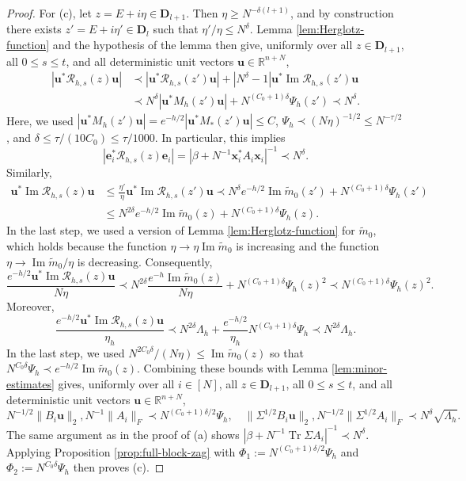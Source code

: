 \documentclass[11pt,reqno]{amsart}
\def\R{\mathbb{R}}
\def\e{\mathbf{e}}
\def\u{\mathbf{u}}
\def\x{\mathbf{x}}
\def\cR{\mathcal{R}}
\def\bD{\mathbf{D}}
\def\Im{\operatorname{Im}}
\def\Tr{\operatorname{Tr}}
\theoremstyle{definition}
\numberwithin{equation}{section}
\numberwithin{figure}{section}
\begin{document}
\begin{proof}
For (c), let $z=E+i\eta\in\bD_{l+1}$. Then $\eta\geq N^{-\delta(l+1)}$, and by construction there exists $z'=E+i\eta'\in\bD_l$ such that $\eta'/\eta\leq N^\delta$. Lemma \ref{lem:Herglotz-function} and the hypothesis of the lemma then give, uniformly over all $z\in\bD_{l+1}$, all $0\le s\leq t$, and all deterministic unit vectors $\u\in\R^{n+N}$,
\begin{align*}
    |\u^*\cR_{h,s}(z)\u|&\prec|\u^*\cR_{h,s}(z')\u|+|N^\delta-1|\u^*\Im\cR_{h,s}(z')\u\\
    &\prec N^\delta|\u^*M_h(z')\u|+N^{(C_0+1)\delta}\Psi_h(z')\prec N^\delta.
\end{align*}
Here, we used $|\u^*M_h(z')\u|=e^{-h/2}|\u^*M_*(z')\u|\leq C$, $\Psi_h\prec (N\eta)^{-1/2}\leq N^{-\tau/2}$, and $\delta\leq \tau/(10C_0)\leq\tau/1000$. In particular, this implies
\[ 
    |\e_i^*\cR_{h,s}(z)\e_i|=|\beta+N^{-1}\x_i^*A_i\x_i|^{-1}\prec N^\delta .
\]
Similarly,
\begin{align*}
    \u^*\Im\cR_{h,s}(z)\u&\leq \frac{\eta'}{\eta}\u^*\Im\cR_{h,s}(z')\u\prec N^\delta e^{-h/2}\Im\widetilde m_0(z')+N^{(C_0+1)\delta}\Psi_h(z')\\
    &\le N^{2\delta}e^{-h/2}\Im\widetilde m_0(z)+N^{(C_0+1)\delta}\Psi_h(z) . 
\end{align*}
In the last step, we used a version of Lemma \ref{lem:Herglotz-function} for $\widetilde m_0$, which holds because the function $\eta\rightarrow \eta\Im\widetilde m_0$ is increasing and the function $\eta\rightarrow\Im\widetilde m_0/\eta$ is decreasing. Consequently,
\[
    \frac{e^{-h/2}\u^*\Im\cR_{h,s}(z)\u}{N\eta}\prec N^{2\delta}\frac{e^{-h}\Im\widetilde m_0(z)}{N\eta}+N^{(C_0+1)\delta}\Psi_h(z)^2\prec N^{(C_0+1)\delta}\Psi_h(z)^2 .
\]
Moreover,
\[
    \frac{e^{-h/2}\u^*\Im\cR_{h,s}(z)\u}{\eta_h}\prec N^{2\delta}\Lambda_h+\frac{e^{-h/2}}{\eta_h}N^{(C_0+1)\delta}\Psi_h\prec N^{2\delta}\Lambda_h .
\]
In the last step, we used $N^{2C_0\delta}/(N\eta)\leq\Im\widetilde m_0(z)$ so that $N^{C_0\delta}\Psi_h\prec e^{-h/2}\Im\widetilde m_0(z)$. Combining these bounds with Lemma \ref{lem:minor-estimates} gives, uniformly over all $i\in[N]$, all $z\in\bD_{l+1}$, all $0\leq s\leq t$, and all deterministic unit vectors $\u\in\R^{n+N}$,
\[
    N^{-1/2}\|B_i\u\|_2,N^{-1}\|A_i\|_F\prec N^{(C_0+1)\delta/2}\Psi_h,\quad \|\Sigma^{1/2}B_i\u\|_2,N^{-1/2}\|\Sigma^{1/2}A_i\|_F\prec N^\delta\sqrt{\Lambda_h}.  
\]
The same argument as in the proof of (a) shows $|\beta+N^{-1}\Tr\Sigma A_i|^{-1}\prec N^\delta$. Applying Proposition \ref{prop:full-block-zag} with $\Phi_1:=N^{(C_0+1)\delta/2}\Psi_h$ and $\Phi_2:=N^{C_0\delta}\Psi_h$ then proves (c).
\end{proof}
\end{document}
